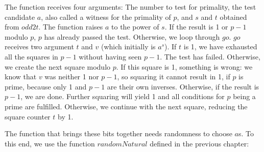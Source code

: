 \documentclass{scrreprt}
\newcommand{\Varid}[1]{\mathit{#1}}
\begin{document}
The function receives four arguments:
The number to test for primality,
the test candidate $a$, 
also called a witness for the primality of $p$,
and $s$ and $t$ obtained from \ensuremath{\Varid{odd2t}}.
The function raises $a$ to the power of $s$.
If the result is 1 or $p-1$ modulo $p$,
$p$ has already passed the test.
Otherwise, we loop through \ensuremath{\Varid{go}}.
\ensuremath{\Varid{go}} receives two argument $t$ and $v$ 
(which initially is $a^s$).
If $t$ is 1, we have exhausted 
all the squares in $p-1$ without having seen $p-1$.
The test has failed.
Otherwise, we create the next square modulo $p$.
If this square is 1, something is wrong:
we know that $v$ was neither 1 nor $p-1$,
so squaring it cannot result in 1, if $p$ is prime,
because only 1 and $p-1$ are their own inverses.
Otherwise, if the result is $p-1$, 
we are done. Further squaring will yield 1
and all conditions for $p$ being a prime are fulfilled.
Otherwise, we continue with the next square,
reducing the square counter $t$ by 1.

The function that brings these bits together
needs randomness to choose $a$s.
To this end, we use the function
\ensuremath{\Varid{randomNatural}} defined in the previous chapter:
\end{document}
